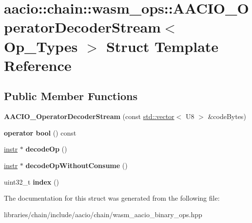 \hypertarget{structaacio_1_1chain_1_1wasm__ops_1_1_a_a_c_i_o___operator_decoder_stream}{}\section{aacio\+:\+:chain\+:\+:wasm\+\_\+ops\+:\+:A\+A\+C\+I\+O\+\_\+\+Operator\+Decoder\+Stream$<$ Op\+\_\+\+Types $>$ Struct Template Reference}
\label{structaacio_1_1chain_1_1wasm__ops_1_1_a_a_c_i_o___operator_decoder_stream}
\subsection*{Public Member Functions}
\begin{DoxyCompactItemize}
\item 
\mbox{\label{structaacio_1_1chain_1_1wasm__ops_1_1_a_a_c_i_o___operator_decoder_stream_a6289f146dad474fd7b6561f8c5471d7f}} 
{\bfseries A\+A\+C\+I\+O\+\_\+\+Operator\+Decoder\+Stream} (const \mbox{\hyperlink{classstd_1_1vector}{std\+::vector}}$<$ U8 $>$ \&code\+Bytes)
\item 
\mbox{\label{structaacio_1_1chain_1_1wasm__ops_1_1_a_a_c_i_o___operator_decoder_stream_a7d6af9c637b0a538dab99baa0ae1680e}} 
{\bfseries operator bool} () const
\item 
\mbox{\label{structaacio_1_1chain_1_1wasm__ops_1_1_a_a_c_i_o___operator_decoder_stream_a5c98f82f08200ba062b090ee2b0581b0}} 
\mbox{\hyperlink{structaacio_1_1chain_1_1wasm__ops_1_1instr}{instr}} $\ast$ {\bfseries decode\+Op} ()
\item 
\mbox{\label{structaacio_1_1chain_1_1wasm__ops_1_1_a_a_c_i_o___operator_decoder_stream_a7548cfb798c151c9d11cdd9e07781d0f}} 
\mbox{\hyperlink{structaacio_1_1chain_1_1wasm__ops_1_1instr}{instr}} $\ast$ {\bfseries decode\+Op\+Without\+Consume} ()
\item 
\mbox{\label{structaacio_1_1chain_1_1wasm__ops_1_1_a_a_c_i_o___operator_decoder_stream_aa76e1f6293f5e0b7876bfc6c234f1d99}} 
uint32\+\_\+t {\bfseries index} ()
\end{DoxyCompactItemize}


The documentation for this struct was generated from the following file\+:\begin{DoxyCompactItemize}
\item 
libraries/chain/include/aacio/chain/wasm\+\_\+aacio\+\_\+binary\+\_\+ops.\+hpp\end{DoxyCompactItemize}
